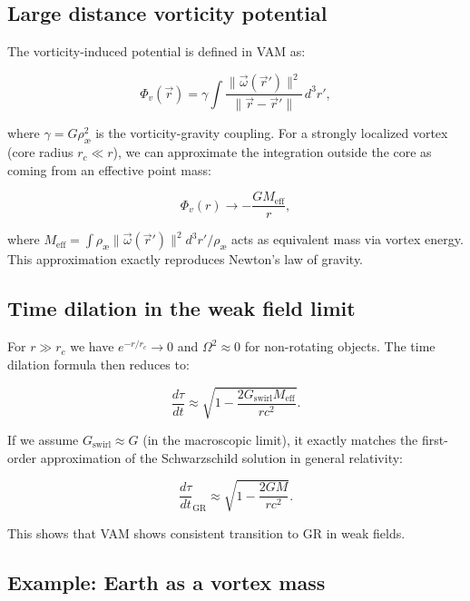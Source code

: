 \documentclass[preprint]{revtex4-2}
\begin{document}
\subsection{Large distance vorticity potential}

The vorticity-induced potential is defined in VAM as:

\begin{equation}
    \Phi_v(\vec{r}) = \gamma \int \frac{\|\vec{\omega}(\vec{r}')\|^2}{\|\vec{r} - \vec{r}'\|} \, d^3r',
\end{equation}

where $\gamma = G \rho_\text{æ}^2$ is the vorticity-gravity coupling. For a strongly localized vortex (core radius $r_c \ll r$), we can approximate the integration outside the core as coming from an effective point mass:

\begin{equation}
    \Phi_v(r) \to -\frac{G M_\text{eff}}{r},
\end{equation}

where $M_\text{eff} = \int \rho_\text{æ} \|\vec{\omega}(\vec{r}')\|^2 d^3r' / \rho_\text{æ}$ acts as equivalent mass via vortex energy. This approximation exactly reproduces Newton's law of gravity.

\subsection{Time dilation in the weak field limit}

For $r \gg r_c$ we have $e^{-r/r_c} \to 0$ and $\Omega^2 \approx 0$ for non-rotating objects. The time dilation formula then reduces to:

\begin{equation}
    \frac{d\tau}{dt} \approx \sqrt{1 - \frac{2 G_\text{swirl} M_\text{eff}}{r c^2}}.
\end{equation}

If we assume $G_\text{swirl} \approx G$ (in the macroscopic limit), it exactly matches the first-order approximation of the Schwarzschild solution in general relativity:

\begin{equation}
    \frac{d\tau}{dt}_\text{GR} \approx \sqrt{1 - \frac{2GM}{rc^2}}.
\end{equation}

This shows that VAM shows consistent transition to GR in weak fields.

\subsection{Example: Earth as a vortex mass}
\end{document}

